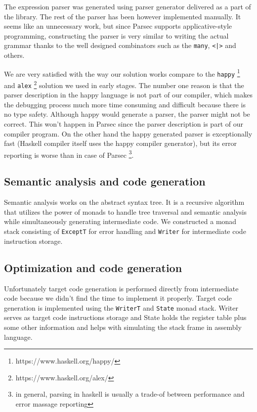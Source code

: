\documentclass[titlepage]{article}
\begin{document}
The expression parser was generated using parser generator delivered as a part of the
library. The rest of the parser has been however implemented manually. It seems like an
unnecessary work, but since Parsec supports applicative-style programming,
constructing the parser is very similar to writing the actual grammar thanks to the well
designed combinators such as the \texttt{many}, \texttt{<|>} and others.

We are very satisfied with the way our solution works compare to the \texttt{happy}
\footnote{https://www.haskell.org/happy/} \cite{happy} and \texttt{alex}
\footnote{https://www.haskell.org/alex/} solution we used in early stages. The number one
reason is that the parser description in the happy language is not part of our
compiler, which makes the debugging process much more time consuming and difficult
because there is no type safety. Although happy would generate a parser, the parser
might not be correct. This won't happen in Parsec since the parser description is
part of our compiler program.
On the other hand the happy generated parser is exceptionally fast (Haskell compiler
itself uses the happy compiler generator), but its error reporting is worse than in
case of Parsec \footnote{in general, parsing in haskell is usually a trade-of between performance
and error massage reporting}.

\subsection{Semantic analysis and code generation}
Semantic analysis works on the abstract syntax tree. It is a recursive algorithm that
utilizes the power of monads to handle tree traversal and semantic analysis while
simultaneously generating intermediate code. We constructed a monad stack consisting of
\texttt{ExceptT} for error handling and \texttt{Writer} for intermediate code instruction
storage.

\subsection{Optimization and code generation}
Unfortunately target code generation is performed directly from intermediate code because
we didn't find the time to implement it properly. Target code generation is implemented
using the \texttt{WriterT} and \texttt{State} monad stack. Writer serves as target code
instructions storage and State holds the register table plus some other information and
helps with simulating the stack frame in assembly language.
\end{document}
